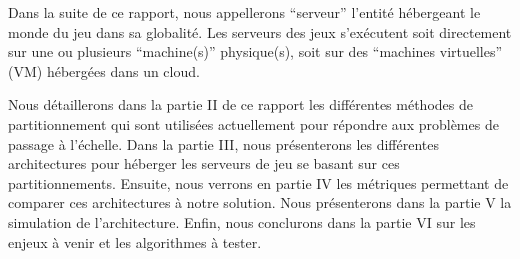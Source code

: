Dans la suite de ce rapport, nous appellerons ``serveur'' l'entité hébergeant le monde du jeu dans sa globalité.
Les serveurs des jeux s'exécutent soit directement sur une ou plusieurs ``machine(s)'' physique(s), soit sur des ``machines virtuelles'' (VM) hébergées dans un cloud.

Nous détaillerons dans la partie II de ce rapport les différentes méthodes de partitionnement qui sont utilisées actuellement pour répondre aux problèmes de passage à l'échelle.
Dans la partie III, nous présenterons les différentes architectures pour héberger les serveurs de jeu se basant sur ces partitionnements.
Ensuite, nous verrons en partie IV les métriques permettant de comparer ces architectures à notre solution.
Nous présenterons dans la partie V la simulation de l'architecture.
Enfin, nous conclurons dans la partie VI sur les enjeux à venir et les algorithmes à tester.
